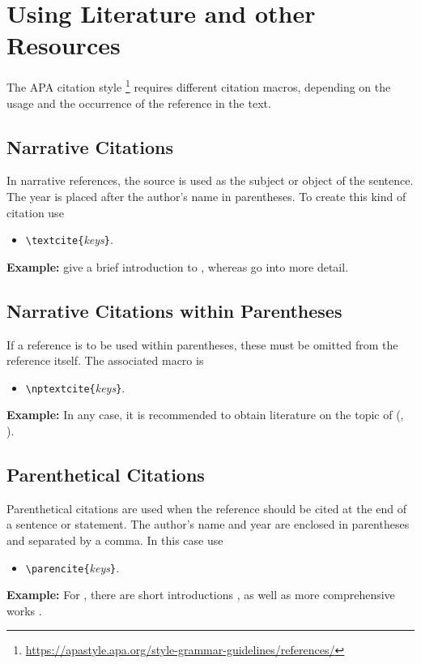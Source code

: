 \chapter[Using Literature]{Using Literature and other Resources}
\label{cha:Literature}

The APA citation style%
\footnote{\url{https://apastyle.apa.org/style-grammar-guidelines/references/}}
requires different citation macros, depending on the usage and the
occurrence of the reference in the text.

\section{Narrative Citations}

In narrative references, the source is used as the subject or object of the sentence. The
year is placed after the author's name in parentheses. To create this kind of citation use 
%
\begin{itemize}
\item[] \verb!\textcite{!\textit{keys}\verb!}!.
\end{itemize}
%
\textbf{Example:}
\textcite{Daniel2018} give a brief introduction to \latex, whereas \textcite{Oetiker2021, Kopka2003} 
go into more detail.


\section{Narrative Citations within Parentheses}

If a reference is to be used within parentheses, these must be omitted from the reference itself. 
The associated macro is
%
\begin{itemize}
\item[] \verb!\nptextcite{!\textit{keys}\verb!}!.
\end{itemize}
%
\textbf{Example:}
In any case, it is recommended to obtain literature on the topic of \latex (\eg, 
).


\section{Parenthetical Citations}

Parenthetical citations are used when the reference should be cited at the end of a sentence or statement.
The author's name and year are enclosed in parentheses and separated by a comma. In this case use
%
\begin{itemize}
\item[] \verb!\parencite{!\textit{keys}\verb!}!.
\end{itemize}
%
\textbf{Example:}
For \latex, there are short introductions \parencite{Daniel2018}, as well as more comprehensive works 
\parencite{Oetiker2021, Kopka2003}.




